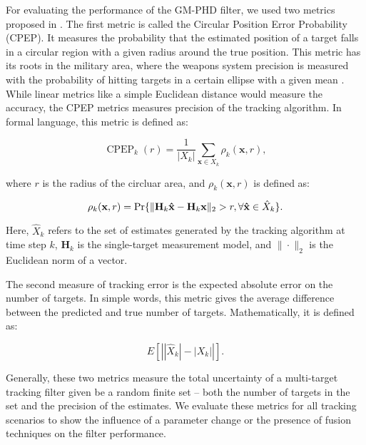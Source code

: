 For evaluating the performance of the GM-PHD filter, we used two metrics proposed in \cite{voGaussianMixtureProbability2006}. The first metric is called the Circular Position Error Probability (CPEP). It measures the probability that the estimated position of a target falls in a circular region with a given radius around the true position. This metric has its roots in the military area, where the weapons system precision is measured with the probability of hitting targets in a certain ellipse with a given mean \cite{nelsonUseCircularError}. While linear metrics like a simple Euclidean distance would measure the accuracy, the CPEP metrics measures precision of the tracking algorithm. In formal language, this metric is defined as:

\begin{equation}
    \operatorname{CPEP}_k (r) = \frac{1}{|X_k|} \sum_{\mathbf{x} \in X_k} \rho_k(\mathbf{x}, r),
\end{equation}

\noindent where $r$ is the radius of the circluar area, and $\rho_k(\mathbf{x}, r)$ is defined as:

\begin{equation}
     \rho_k(\mathbf{x}, r) = \Pr{\| \mathbf{H}_k \mathbf{\hat{x}} - \mathbf{H}_k \mathbf{x}\|_2 > r, \forall \mathbf{\hat{x}} \in \Hat{X}_k}.
\end{equation}

\noindent Here, $\hat{X}_k$ refers to the set of estimates generated by the tracking algorithm at time step $k$, $\mathbf{H}_k$ is the single-target measurement model, and $\| \cdot \|_2$ is the Euclidean norm of a vector.

The second measure of tracking error is the expected absolute error on the number of targets. In simple words, this metric gives the average difference between the predicted and true number of targets. Mathematically, it is defined as:

\begin{equation}
    E\left[ \left||\hat{X}_k| - |X_k|\right| \right].
\end{equation}

Generally, these two metrics measure the total uncertainty of a multi-target tracking filter given be a random finite set -- both the number of targets in the set and the precision of the estimates. We evaluate these metrics for all tracking scenarios to show the influence of a parameter change or the presence of fusion techniques on the filter performance.

